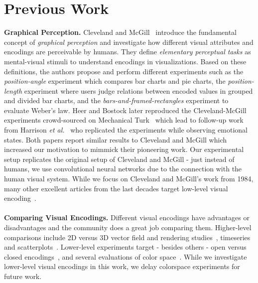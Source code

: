 \section{Previous Work}

\textbf{Graphical Perception.} Cleveland and McGill~\cite{cleveland_mcgill} introduce the fundamental concept of \emph{graphical perception} and investigate how different visual attributes and encodings are perceivable by humans. They define \emph{elementary perceptual tasks} as mental-visual stimuli to understand encodings in visualizations. Based on these definitions, the authors propose and perform different experiments such as the \emph{position-angle} experiment which compares bar charts and pie charts, the \emph{position-length} experiment where users judge relations between encoded values in grouped and divided bar charts, and the \emph{bars-and-framed-rectangles} experiment to evaluate Weber's law. Heer and Bostock later reproduced the Cleveland-McGill experiments crowd-sourced on Mechanical Turk~\cite{HeerBostock2010} which lead to follow-up work from Harrison \textit{et al.}~\cite{harrison2013influencing} who replicated the experiments while observing emotional states. Both papers report similar results to Cleveland and McGill which increased our motivation to mimmick their pioneering work. Our experimental setup replicates the original setup of Cleveland and McGill - just instead of humans, we use convolutional neural networks due to the connection with the human visual system. While we focus on Cleveland and McGill's work from 1984, many other excellent articles from the last decades target low-level visual encoding~\cite{bertin1967semiologie,cleveland1985graphical,treisman1988feature, wilkinson2006grammar, carpendale2003considering,widgor_perception2007,munzner2015visualization}.
\\~\\
\textbf{Comparing Visual Encodings.} Different visual encodings have advantages or disadvantages and the community does a great job comparing them. Higher-level comparisons include 2D versus 3D vector field and rendering studies~\cite{mckenzie_2d_3d,forsberg2009comparing_3d_vector,laidlaw_2d_vector,borkin2011arteries}, timeseries~\cite{herr2009timeseries} and scatterplots~\cite{tremmel1995visual,Wang_linegraph_vs_scatterplot}. Lower-level experiments target - besides others - open versus closed encodings~\cite{open_vs_closed_shapes}, and several evaluations of color space~\cite{ware1988color,rheingans1992color,Rogowitz2001_colormaps,kindlmann2002color}. While we investigate lower-level visual encodings in this work, we delay colorspace experiments for future work.

